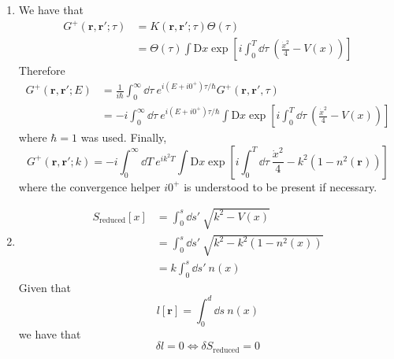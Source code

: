\documentclass[12pt]{article}
\newcommand{\cint}[2]{\int_{#1}^{#2}}
\newcommand{\cintd}[3]{\cint{#1}{#2}\dd#3\:}
\begin{document}
\begin{enumerate}[label=(\alph*)]
    \item
    We have that 
    \begin{align*}
        G^+(\mathbf{r},\mathbf{r}';\tau) &= K(\mathbf{r}, \mathbf{r}';\tau)\Theta(\tau) \\
        &= \Theta(\tau)\int \text{D}x \exp[i\cintd{0}{T}{\tau}\left(\frac{\dot{x}^2}{4} - V(x)\right)]
    \end{align*}
    Therefore
    \begin{align*}
        G^+(\mathbf{r},\mathbf{r}';E) &= \frac{1}{i\hbar}\cintd{0}{\infty}{\tau}e^{i(E+i0^+)\tau/\hbar}G^+(\mathbf{r},\mathbf{r}',\tau) \\
        &= -i\cintd{0}{\infty}{\tau}e^{i(E+i0^+)\tau/\hbar}\int \text{D}x \exp[i\cintd{0}{T}{\tau}\left(\frac{\dot{x}^2}{4} - V(x)\right)]
    \end{align*}
    where $\hbar =1$ was used. Finally,
    \[ G^+(\mathbf{r},\mathbf{r}';k) = -i\cintd{0}{\infty}{T}e^{ik^2T}\int\text{D}x\exp[i\cintd{0}{T}{\tau}\frac{\dot{x}^2}{4} - k^2(1-n^2(\mathbf{r}))] \]
    where the convergence helper $i0^+$ is understood to be present if necessary.


    \item
    \begin{align*}
        S_\text{reduced}[x] &= \cintd{0}{s}{s'}\sqrt{k^2 - V(x)} \\
        &= \cintd{0}{s}{s'} \sqrt{k^2 - k^2(1 - n^2(x))} \\
        &= k\cintd{0}{s}{s'} n(x)
    \end{align*}
    Given that
    \[ l[\mathbf{r}] = \cintd{0}{d}{s}n(x) \]
    we have that
    \[ \delta l = 0 \iff \delta S_\text{reduced} = 0 \]
\end{enumerate}
\end{document}
